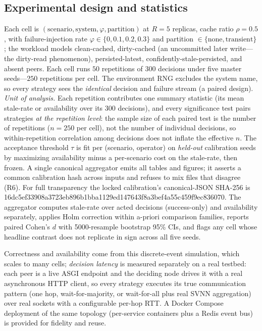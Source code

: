 \documentclass[11pt]{article}
\begin{document}
\subsection{Experimental design and statistics}
Each cell is $(\text{scenario},\text{system},\varphi,\text{partition})$ at $R=5$ replicas, cache
ratio $\rho=0.5$, with failure-injection rate $\varphi\in\{0,0.1,0.2,0.3\}$ and partition
$\in\{\text{none},\text{transient}\}$; the workload models clean-cached, dirty-cached (an uncommitted
later write---the dirty-read phenomenon), persisted-latest, confidently-stale-persisted, and absent
peers. Each cell runs $50$ repetitions of $300$ decisions under five master seeds---$250$ repetitions
per cell. The environment RNG excludes the system name, so every strategy sees the \emph{identical}
decision and failure stream (a paired design). \emph{Unit of analysis.} Each repetition contributes one
summary statistic (its mean stale-rate or availability over its $300$ decisions), and every significance
test pairs strategies \emph{at the repetition level}: the sample size of each paired test is the number
of repetitions ($n=250$ per cell), not the number of individual decisions, so within-repetition
correlation among decisions does not inflate the effective $n$. The acceptance threshold $\tau$ is fit
per (scenario, operator) on \emph{held-out} calibration seeds by maximizing availability minus a
per-scenario cost on the stale-rate, then frozen. A single canonical aggregator emits all tables and
figures; it asserts a common calibration hash across inputs and refuses to mix files that disagree (R6).
For full transparency the locked calibration's canonical-JSON SHA-256 is
{\footnotesize\ttfamily 16dc5ef33908a3723eb896b1bba1129ed147643f8a3bef4a55c459f9ec836070}. The aggregator
computes stale-rate over acted decisions (success-only) and availability separately, applies Holm
correction within a-priori comparison families, reports paired Cohen's $d$ with 5000-resample bootstrap
95\% CIs, and flags any cell whose headline contrast does not replicate in sign across all five seeds.

Correctness and availability come from this discrete-event simulation, which scales to many cells;
\emph{decision latency} is measured separately on a real testbed: each peer is a live ASGI endpoint
and the deciding node drives it with a real asynchronous HTTP client, so every strategy executes its
true communication pattern (one hop, wait-for-majority, or wait-for-all plus real SVNN aggregation)
over real sockets with a configurable per-hop RTT. A Docker Compose deployment of the same topology
(per-service containers plus a Redis event bus) is provided for fidelity and reuse.
\end{document}
